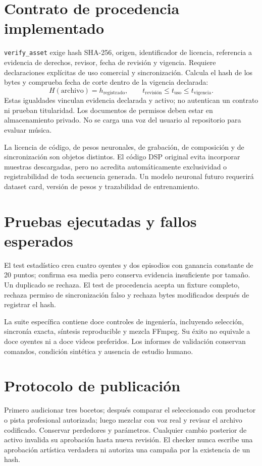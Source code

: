 \documentclass[11pt,a4paper]{article}
\begin{document}
\newpage
\section{Contrato de procedencia implementado}
\texttt{verify\_asset} exige hash SHA-256, origen, identificador de licencia, referencia a evidencia de derechos, revisor, fecha de revisión y vigencia. Requiere declaraciones explícitas de uso comercial y sincronización. Calcula el hash de los bytes y comprueba fecha de corte dentro de la vigencia declarada:
\begin{equation}
 H(\mathrm{archivo})=h_{\mathrm{registrado}},\qquad
 t_{\mathrm{revisión}}\leq t_{\mathrm{uso}}\leq t_{\mathrm{vigencia}}.
\end{equation}
Estas igualdades vinculan evidencia declarada y activo; no autentican un contrato ni prueban titularidad. Los documentos de permisos deben estar en almacenamiento privado. No se carga una voz del usuario al repositorio para evaluar música.

La licencia de código, de pesos neuronales, de grabación, de composición y de sincronización son objetos distintos. El código DSP original evita incorporar muestras descargadas, pero no acredita automáticamente exclusividad o registrabilidad de toda secuencia generada. Un modelo neuronal futuro requerirá dataset card, versión de pesos y trazabilidad de entrenamiento.
\section{Pruebas ejecutadas y fallos esperados}
El test estadístico crea cuatro oyentes y dos episodios con ganancia constante de 20 puntos; confirma esa media pero conserva evidencia insuficiente por tamaño. Un duplicado se rechaza. El test de procedencia acepta un fixture completo, rechaza permiso de sincronización falso y rechaza bytes modificados después de registrar el hash.

La suite específica contiene doce controles de ingeniería, incluyendo selección, sincronía exacta, síntesis reproducible y mezcla FFmpeg. Su éxito no equivale a doce oyentes ni a doce videos preferidos. Los informes de validación conservan comandos, condición sintética y ausencia de estudio humano.
\section{Protocolo de publicación}
Primero audicionar tres bocetos; después comparar el seleccionado con productor o pista profesional autorizada; luego mezclar con voz real y revisar el archivo codificado. Conservar perdedores y parámetros. Cualquier cambio posterior de activo invalida su aprobación hasta nueva revisión. El checker nunca escribe una aprobación artística verdadera ni autoriza una campaña por la existencia de un hash.
\end{document}
